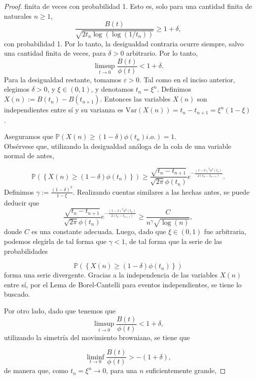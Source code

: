 \documentclass[letterpaper]{article}
\renewcommand{\to}{\rightarrow}
\renewcommand{\P}{\mathbb{P}}
\newcommand{\1}{\mathds{1}}
\theoremstyle{definition}
\theoremstyle{definition}
\theoremstyle{definition}
\theoremstyle{definition}
\theoremstyle{definition}
\begin{document}
\begin{enumerate}
\begin{proof}
      finita de veces con probabilidad 1. Esto es, solo para una cantidad finita de naturales $n\geq1$,
      \[
        \frac{B(t)}{\sqrt{2t_n\log(\log(1/t_{n}))}}\geq 1+\delta,
      \]
      con probabilidad 1. Por lo tanto, la desigualdad contraria ocurre siempre, salvo una cantidad
      finita de veces, para $\delta>0$ arbitrario. Por lo tanto,
      \[
        \limsup_{t\to 0}\frac{B(t)}{\phi(t)}<1+\delta.
      \]
      Para la desigualdad restante, tomamos $\varepsilon>0$. Tal como en el inciso anterior,
      elegimos $\delta>0$, y $\xi \in (0,1)$, y denotamos $t_n=\xi^n$. Definimos $X(n):=B(t_n)-B(t_{n+1})$.
      Entonces las variables $X(n)$ son independientes entre sí y su varianza es $\text{Var}\left(X(n)\right)=t_n-t_{n+1}=\xi^n(1-\xi)$.
      \newline

      Aseguramos que $\P\left(X(n)\geq(1-\delta)\phi(t_n) i.o.\right)=1$.\\
      
      Obsérvese que, utilizando la desigualdad análoga de la cola de una variable normal de antes,

      \[
      \P\left(\left\{X(n)\geq(1-\delta)\phi(t_n)\right\}\right)\geq \frac{\sqrt{t_n-t_{n+1}}}{\sqrt{2\pi}\phi(t_n)}e^{-\frac{(1-\delta)^2\phi^2(t_{n})}{2(t_n-t_{n+1})}}.
      \]
      Definimos $\gamma:=\frac{(1-\delta)^2}{1-\xi}$. Realizando cuentas similares a las hechas antes, se 
      puede deducir que
      \[
        \frac{\sqrt{t_n-t_{n+1}}}{\sqrt{2\pi}\phi(t_n)}e^{-\frac{(1-\delta)^2\phi^2(t_{n})}{2(t_n-t_{n+1})}}\geq \frac{C}{n^{\gamma}\sqrt{\log(n)}},
      \]
      donde $C$ es una constante adecuada. Luego, dado que $\xi \in (0,1)$ fue arbitraria, podemos elegirla de tal forma 
      que $\gamma<1$, de tal forma que la serie de las probabilidades

      \[
        \P\left(\left\{X(n)\geq(1-\delta)\phi(t_n)\right\}\right)
      \]
      forma una serie divergente. Gracias a la independencia de las variables $X(n)$ entre sí,
      por el Lema de Borel-Cantelli para eventos independientes, se tiene lo buscado.
      \newline

      Por otro lado, dado que tenemos que
      \[
        \limsup_{t\to 0}\frac{B(t)}{\phi(t)}<1+\delta,
      \]
      utilizando la simetría del movimiento browniano, se tiene que

      \[
        \liminf_{t\to 0}\frac{B(t)}{\phi(t)}>-(1+\delta),  
      \]
      de manera que, como $t_n=\xi^n\to0$, para una $n$ suficientemente
      grande,


\end{proof}
\end{enumerate}
\end{document}
